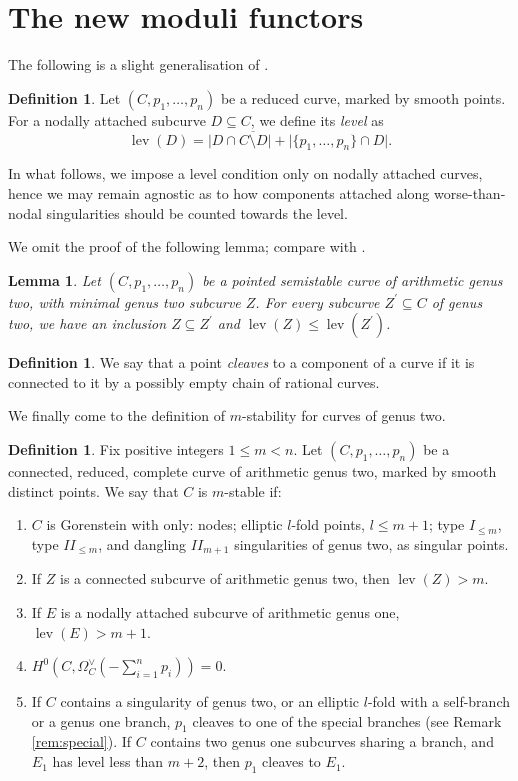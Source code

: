 \documentclass{compositio}
\newcommand{\lev}{\operatorname{lev}}
\theoremstyle{plain}
\newtheorem{lem}[thm]{Lemma}
\theoremstyle{definition}
\newtheorem{definition}[thm]{Definition}
\theoremstyle{remark}
\begin{document}
\section{The new moduli functors}\label{sec:stability}
The following is a slight generalisation of \cite[Definition 3.4]{SMY1}.
\begin{definition}
 Let $(C,p_1,\ldots,p_n)$ be a reduced curve, marked by smooth points. For a nodally attached subcurve $D\subseteq C$, we define its \emph{level} as \[ \lev(D)=\lvert D\cap\overline{C\setminus D}\rvert+\lvert\{p_1,\ldots,p_n\}\cap D\rvert.\]
\end{definition}
In what follows, we impose a level condition only on nodally attached curves, hence we may remain agnostic as to how components attached along worse-than-nodal singularities should be counted towards the level.


We omit the proof of the following lemma; compare with \cite[Corollary 3.2, Lemma 3.5]{SMY1}.
\begin{lem}
 Let $(C,p_1,\ldots,p_n)$ be a pointed \emph{semistable} curve of arithmetic genus two, with minimal genus two subcurve $Z$. For every subcurve $Z^\prime\subseteq C$ of genus two, we have an inclusion $Z\subseteq Z^\prime$ and $\lev(Z)\leq\lev(Z^\prime)$.
\end{lem}

\begin{definition}
We say that a point \emph{cleaves} to a component of a curve if it is connected to it by a possibly empty chain of rational curves. 
\end{definition}

We finally come to the definition of $m$-stability for curves of genus two.
\begin{definition}\label{def:m-stability}
 Fix positive integers $1\leq m<n$. Let $(C,p_1,\ldots,p_n)$ be a connected, reduced, complete curve of arithmetic genus two, marked by smooth distinct points. We say that $C$ is $m$-stable if:
 \begin{enumerate}[leftmargin=.7cm]
  \item\label{cond:sing} $C$ is Gorenstein with only: nodes; elliptic $l$-fold points, $l\leq m+1$; type $I_{\leq m}$, type $I\!I_{\leq m}$, and dangling $I\!I_{m+1}$ singularities of genus two, as singular points.
  \item\label{cond:lev2} If $Z$ is a connected subcurve of arithmetic genus two, then $\lev(Z)>m$.
  \item\label{cond:lev1} If $E$ is a nodally attached subcurve of arithmetic genus one, $\lev(E)>m+1$.
  \item\label{cond:aut} $H^0(C,\Omega_C^\vee(-\sum_{i=1}^n p_i))=0$.
  \item\label{cond:p1} If $C$ contains a singularity of genus two, or an elliptic $l$-fold with a self-branch or a genus one branch, $p_1$ cleaves to one of the special branches (see Remark \ref{rem:special}). If $C$ contains two genus one subcurves sharing a branch, and $E_1$ has level less than $m+2$, then $p_1$ cleaves to $E_1$.
 \end{enumerate}
\end{definition}
\end{document}
